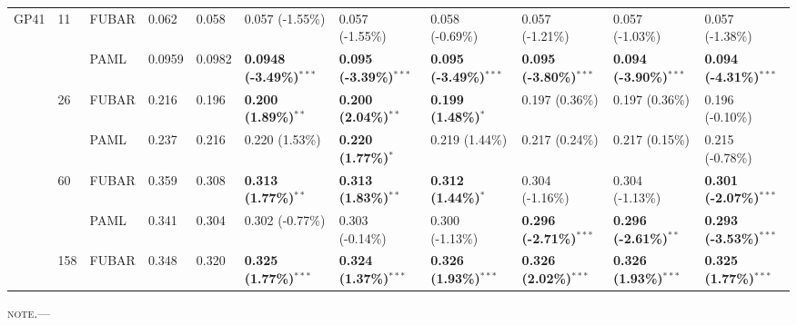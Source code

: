 \documentclass[11pt]{article}
\begin{document}
\begin{sidewaystable}[htbp]
\begin{adjustwidth}{-2.25cm}{}
\begin{tabular}{l l l l l l l l l l l}
GP41  &  11 &  FUBAR  &  0.062  &  0.058  &  0.057 (-1.55\%)  &  0.057 (-1.55\%)  &  0.058 (-0.69\%)  &  0.057 (-1.21\%)  &  0.057 (-1.03\%)  &  0.057 (-1.38\%)  \\
  &    &  PAML        &  0.0959  &  0.0982  &  \textbf{0.0948 (-3.49\%)}$^{\ast\ast\ast}$  &  \textbf{0.095 (-3.39\%)}$^{\ast\ast\ast}$  &  \textbf{0.095 (-3.49\%)}$^{\ast\ast\ast}$  &  \textbf{0.095 (-3.80\%)}$^{\ast\ast\ast}$  &  \textbf{0.094 (-3.90\%)}$^{\ast\ast\ast}$  &  \textbf{0.094 (-4.31\%)}$^{\ast\ast\ast}$  \\
\hline
  &  26  &  FUBAR     &  0.216  &  0.196  &  \textbf{0.200 (1.89\%)}$^{\ast\ast}$  &  \textbf{0.200 (2.04\%)}$^{\ast\ast}$  &  \textbf{0.199 (1.48\%)}$^{\ast}$  &  0.197 (0.36\%)  &  0.197 (0.36\%)  &  0.196 (-0.10\%)  \\ 
  &    &  PAML        &  0.237  &  0.216  &  0.220 (1.53\%)  &  \textbf{0.220 (1.77\%)}$^{\ast}$  &  0.219 (1.44\%)  &  0.217 (0.24\%)  &  0.217 (0.15\%)  &  0.215 (-0.78\%)  \\ 
\hline
  &  60  &  FUBAR     &  0.359  &  0.308  &  \textbf{0.313 (1.77\%)}$^{\ast\ast}$  &  \textbf{0.313 (1.83\%)}$^{\ast\ast}$  &  \textbf{0.312 (1.44\%)}$^{\ast}$  &  0.304 (-1.16\%)  &  0.304 (-1.13\%)  &  \textbf{0.301 (-2.07\%)}$^{\ast\ast\ast}$  \\
  &    &  PAML        &  0.341  &  0.304  &  0.302 (-0.77\%)  &  0.303 (-0.14\%)  &  0.300 (-1.13\%)  &  \textbf{0.296 (-2.71\%)}$^{\ast\ast\ast}$  &  \textbf{0.296 (-2.61\%)}$^{\ast\ast}$  &  \textbf{0.293 (-3.53\%)}$^{\ast\ast\ast}$  \\
\hline
  &  158  &  FUBAR    &  0.348  &  0.320  &  \textbf{0.325 (1.77\%)}$^{\ast\ast\ast}$  &  \textbf{0.324 (1.37\%)}$^{\ast\ast\ast}$  &  \textbf{0.326 (1.93\%)}$^{\ast\ast\ast}$  &  \textbf{0.326 (2.02\%)}$^{\ast\ast\ast}$  &  \textbf{0.326 (1.93\%)}$^{\ast\ast\ast}$  &  \textbf{0.325 (1.77\%)}$^{\ast\ast\ast}$  \\
\hline\end{tabular}
\newline
\textsc{note.}--- %
\end{adjustwidth}
\end{sidewaystable}
\end{document}
